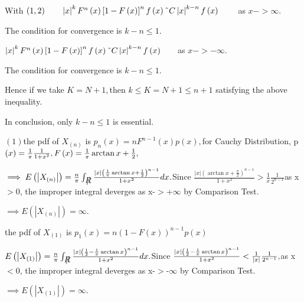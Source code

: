 \documentclass{article}
\def\TEXTsymbol#1{\mbox{$#1$}}%
\def\NEG#1{\leavevmode\hbox{\rlap{\thinspace/}{$#1$}}}%
\begin{document}
\bigskip With $\left( 1,2\right) \qquad \left\vert x\right\vert
^{k}F^{n}\left( x\right) \left[ 1-F\left( x\right) \right] ^{n}f\left(
x\right) \symbol{126}C\left\vert x\right\vert ^{k-n}f\left( x\right) \qquad $%
as $x->\infty .$

The condition for convergence is $k-n\leq 1.$

$\left\vert x\right\vert ^{k}F^{n}\left( x\right) \left[ 1-F\left( x\right) %
\right] ^{n}f\left( x\right) \symbol{126}C\left\vert x\right\vert
^{k-n}f\left( x\right) \qquad $as $x->-\infty .$

The condition for convergence is $k-n\leq 1.$

Hence if we take $K=N+1,$then $k\leq K=N+1\leq n+1$ satisfying the above
inequality.

In conclusion, only  $k-n\leq 1$ is essential.



$\left( 1\right) $the pdf of $X_{\left( n\right) }$ is $p_{n}\left( x\right)
=nF^{n-1}\left( x\right) p\left( x\right) ,$for Cauchy Distribution, p$%
\left( x\right) =\frac{1}{\pi }\frac{1}{1+x^{2}},F\left( x\right) =\frac{1}{%
\pi }\arctan x+\frac{1}{2},$

$\implies E\left( \left\vert X_{\left( n\right) }\right\vert \right) =\frac{n%
}{\pi }\int_{\NEG{R}}\frac{\left\vert x\right\vert \left( \frac{1}{\pi }%
\arctan x+\frac{1}{2}\right) ^{n-1}}{1+x^{2}}dx.$Since $\frac{\left\vert
x\right\vert \left( \arctan x+\frac{\pi }{2}\right) ^{n-1}}{1+x^{2}}>\frac{1%
}{x}\frac{1}{2^{n-1}}$as x\TEXTsymbol{>}0, the improper integral deverges as
x-\TEXTsymbol{>}+$\infty $ by Comparison Test.

$\implies E\left( \left\vert X_{\left( n\right) }\right\vert \right) =\infty
.$

the pdf of $X_{\left( 1\right) }$ is $p_{1}\left( x\right) =n\left(
1-F\left( x\right) \right) ^{n-1}p\left( x\right) $

$E\left( \left\vert X_{\left( 1\right) }\right\vert \right) =\frac{n}{\pi }%
\int_{\NEG{R}}\frac{\left\vert x\right\vert \left( \frac{1}{2}-\frac{1}{\pi }%
\arctan x\right) ^{n-1}}{1+x^{2}}dx.$Since $\frac{\left\vert x\right\vert
\left( \frac{1}{2}-\frac{1}{\pi }\arctan x\right) ^{n-1}}{1+x^{2}}<\frac{1}{%
\left\vert x\right\vert }\frac{1}{2^{n-1}},$as x\TEXTsymbol{<}0, the
improper integral deverges as x-\TEXTsymbol{>}-$\infty $ by Comparison Test.

$\implies E\left( \left\vert X_{\left( 1\right) }\right\vert \right) =\infty
.$
\end{document}
